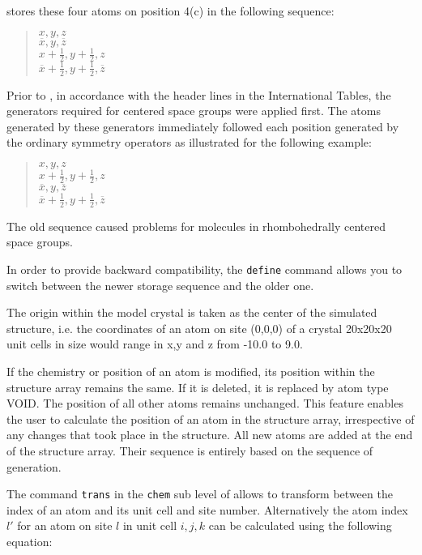 \Discus stores these four atoms on position 4(c) in the
following sequence:

\begin{quote}
       $x,y,z$\\
       $\overline{x},y,\overline{z}$\\
       $x+\frac{1}{2},y+\frac{1}{2},z$\\
       $\overline{x}+\frac{1}{2},y+\frac{1}{2},\overline{z}$
\end{quote}

Prior to , in accordance with the header lines in
the International Tables,
the generators required for centered space groups were applied first.
The atoms generated by these generators immediately followed each
position generated by the ordinary symmetry operators as illustrated
for the following example:

\begin{quote}
       $x,y,z$\\
       $x+\frac{1}{2},y+\frac{1}{2},z$\\
       $\overline{x},y,\overline{z}$\\
       $\overline{x}+\frac{1}{2},y+\frac{1}{2},\overline{z}$
\end{quote}

The old sequence caused problems for molecules in rhombohedrally
centered space groups. 

In order to provide backward compatibility, the {\tt define}
command allows you to switch between the newer storage sequence
and the older one.

The origin within the model crystal is taken as the center of the
simulated structure, i.e.  the coordinates of an atom on site
(0,0,0) of a crystal 20x20x20 unit cells in size would range in x,y
and z from -10.0 to 9.0.
\par

If the chemistry or position of an atom is modified, its position
within the structure array remains the same.  If it is deleted, it
is replaced by atom type VOID.  The position of all other atoms
remains unchanged.  This feature enables the user to calculate the
position of an atom in the structure array, irrespective of any
changes that took place in the structure.  All new atoms are added
at the end of the structure array. Their sequence is entirely based
on the sequence of generation. \par

The command {\tt trans} in the {\tt chem} sub level of \Discus
allows to transform between the index of an atom and its unit cell
and site number. Alternatively the atom index $l'$ for an atom on
site $l$ in unit cell $i,j,k$ can be calculated using the following
equation:

